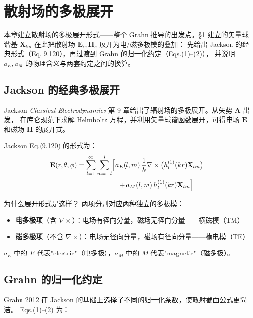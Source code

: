 \section{散射场的多极展开}

本章建立散射场的多极展开形式——整个 Grahn 推导的出发点。\S1 建立的矢量球谐基
$\mathbf{X}_{lm}$ 在此把散射场 $\mathbf{E}_s,\mathbf{H}_s$ 展开为电/磁多极模的叠加：
先给出 Jackson 的经典形式（Eq. 9.120），再过渡到 Grahn 的归一化约定（Eqs.(1)--(2)），
并说明 $a_E,a_M$ 的物理含义与两套约定之间的换算。

\subsection{Jackson 的经典多极展开}

Jackson \textit{Classical Electrodynamics} 第 9 章给出了辐射场的多极展开。从矢势 $\mathbf{A}$ 出发，
在库仑规范下求解 Helmholtz 方程，并利用矢量球谐函数展开，可得电场 $\mathbf{E}$ 和磁场 $\mathbf{H}$ 的展开式。

Jackson Eq.(9.120) 的形式为：
\begin{align}
  \mathbf{E}(r,\theta,\phi) &= \sum_{l=1}^\infty\sum_{m=-l}^l \Bigl[
    a_E(l,m)\,\frac{1}{k}\nabla\times\bigl(h_l^{(1)}(kr)\mathbf{X}_{lm}\bigr) \notag\\
    &\qquad\qquad\qquad + a_M(l,m)\,h_l^{(1)}(kr)\mathbf{X}_{lm} \Bigr] \label{eq:Jackson_E}
\end{align}

\begin{stepbox}{为什么展开形式是这样？}
两项分别对应两种独立的多极模：
\begin{itemize}
  \item \textbf{电多极项}（含 $\nabla\times$）：电场有径向分量，磁场无径向分量——横磁模（TM）
  \item \textbf{磁多极项}（不含 $\nabla\times$）：电场无径向分量，磁场有径向分量——横电模（TE）
\end{itemize}
$a_E$ 中的 $E$ 代表"electric"（电多极），$a_M$ 中的 $M$ 代表"magnetic"（磁多极）。
\end{stepbox}

\subsection{Grahn 的归一化约定}

Grahn 2012 在 Jackson 的基础上选择了不同的归一化系数，使散射截面公式更简洁。
Eqs.(1)--(2) 为：

